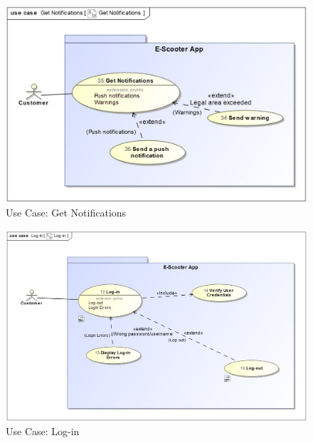 \documentclass[a4paper, 12pt]{article}
\begin{document}
\begin{figure} [htbp]
  \begin{center}
    \includegraphics[scale=0.6]{images/UseCases/GetNotifications.png}
  \end{center}
  \caption{Use Case: Get Notifications}
\end{figure}

\begin{figure} [htbp]
  \begin{center}
    \includegraphics[scale=0.6]{images/UseCases/Log-in.png}
  \end{center}
  \caption{Use Case: Log-in}
\end{figure}
\end{document}
